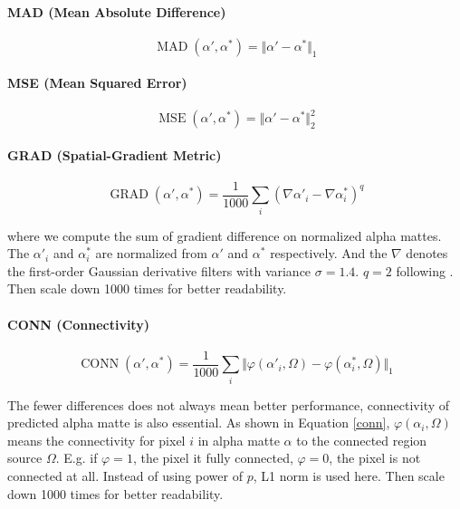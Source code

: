 \documentclass[final]{cvpr}
\begin{document}
\paragraph{MAD (Mean Absolute Difference)}

\begin{equation}\label{mad}
    \operatorname{MAD}(\alpha', \alpha^*)=\Vert\alpha'-\alpha^*\Vert_1
\end{equation}

\paragraph{MSE (Mean Squared Error)}

\begin{equation}\label{mse}
    \operatorname{MSE}(\alpha', \alpha^*)=\Vert\alpha'-\alpha^*\Vert_2^2
\end{equation}

\paragraph{GRAD (Spatial-Gradient Metric)}

\begin{equation}\label{grad}
    \operatorname{GRAD}(\alpha', \alpha^*)=\frac{1}{1000}\sum_i(\nabla \alpha'_i-\nabla \alpha^*_i)^q
\end{equation}

where we compute the sum of gradient difference on normalized alpha mattes.
The $\alpha'_i$ and $\alpha^*_i$ are normalized from $\alpha'$ and $\alpha^*$ respectively.
And the $\nabla$ denotes the first-order Gaussian derivative filters with variance $\sigma=1.4$. $q=2$ following \cite{linRealTimeHighResolutionBackground2020a}.
Then scale down 1000 times for better readability.

\paragraph{CONN (Connectivity)}

\begin{equation}\label{conn}
    \operatorname{CONN}(\alpha', \alpha^*)=\frac{1}{1000}\sum_i\Vert\varphi(\alpha'_i,\Omega)-\varphi(\alpha^*_i,\Omega)\Vert_1
\end{equation}

The fewer differences does not always mean better performance, connectivity of predicted alpha matte is also essential.
As shown in Equation \ref{conn}, $\varphi(\alpha_i,\Omega)$ means the connectivity for pixel $i$ in alpha matte $\alpha$ to the connected region source $\Omega$.
E.g. if $\varphi=1$, the pixel it fully connected, $\varphi=0$, the pixel is not connected at all. Instead of using power of $p$, L1 norm is used here.
Then scale down 1000 times for better readability.
\end{document}
